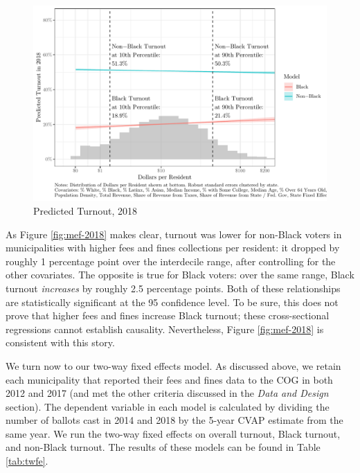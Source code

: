\documentclass[
  12pt,
]{article}
\begin{document}
\begin{figure}[H]

{\centering \includegraphics{draft_paper_files/figure-latex/cross-18-1} 

}

\caption{\label{fig:mef-2018}Predicted Turnout, 2018}\label{fig:cross-18}
\end{figure}

As Figure \ref{fig:mef-2018} makes clear, turnout was lower for non-Black voters in municipalities with higher fees and fines collections per resident: it dropped by roughly 1 percentage point over the interdecile range, after controlling for the other covariates. The opposite is true for Black voters: over the same range, Black turnout \emph{increases} by roughly 2.5 percentage points. Both of these relationships are statistically significant at the 95 confidence level. To be sure, this does not prove that higher fees and fines increase Black turnout; these cross-sectional regressions cannot establish causality. Nevertheless, Figure \ref{fig:mef-2018} is consistent with this story.

We turn now to our two-way fixed effects model. As discussed above, we retain each municipality that reported their fees and fines data to the COG in both 2012 and 2017 (and met the other criteria discussed in the \emph{Data and Design} section). The dependent variable in each model is calculated by dividing the number of ballots cast in 2014 and 2018 by the 5-year CVAP estimate from the same year. We run the two-way fixed effects on overall turnout, Black turnout, and non-Black turnout. The results of these models can be found in Table \ref{tab:twfe}.

\begin{singlespace}

\end{singlespace}
\end{document}
